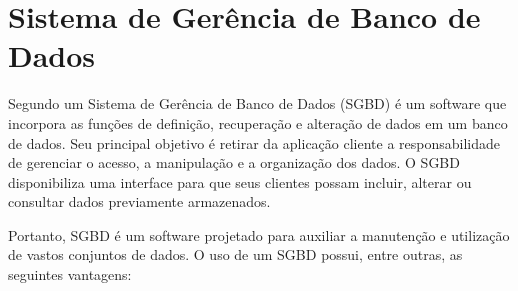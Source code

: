 
\section{Sistema de Gerência de Banco de Dados }

Segundo  um Sistema de Gerência de Banco de Dados (\ac{SGBD}) é um software que incorpora as funções de definição, recuperação e alteração de dados em um banco de dados. Seu principal objetivo é retirar da aplicação cliente a responsabilidade de gerenciar o acesso, a manipulação e a organização dos dados. O SGBD disponibiliza uma interface para que seus clientes possam incluir, alterar ou consultar dados previamente armazenados. 

Portanto, \ac{SGBD} é um software projetado para auxiliar a manutenção e utilização de vastos conjuntos de dados. \cite{ramakrishnan2008sistemas} O uso de um SGBD possui, entre outras, as seguintes vantagens: 

